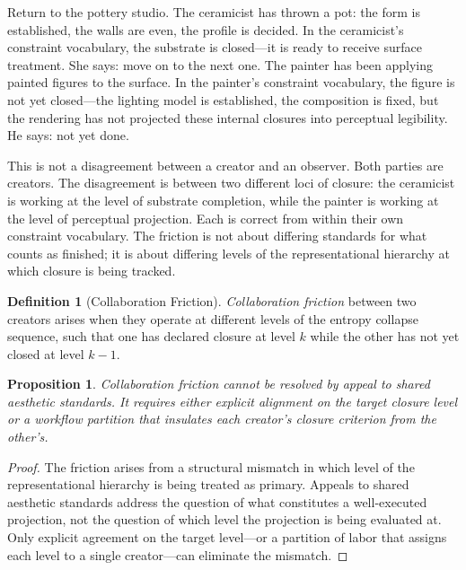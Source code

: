 \documentclass[11pt, twoside]{article}
\theoremstyle{plain}
\newtheorem{proposition}[theorem]{Proposition}
\theoremstyle{definition}
\newtheorem{definition}[theorem]{Definition}
\theoremstyle{remark}
\begin{document}
Return to the pottery studio. The ceramicist has thrown a pot: the form is established, the walls are even, the profile is decided. In the ceramicist's constraint vocabulary, the substrate is closed---it is ready to receive surface treatment. She says: move on to the next one. The painter has been applying painted figures to the surface. In the painter's constraint vocabulary, the figure is not yet closed---the lighting model is established, the composition is fixed, but the rendering has not projected these internal closures into perceptual legibility. He says: not yet done.

This is not a disagreement between a creator and an observer. Both parties are creators. The disagreement is between two different loci of closure: the ceramicist is working at the level of substrate completion, while the painter is working at the level of perceptual projection. Each is correct from within their own constraint vocabulary. The friction is not about differing standards for what counts as finished; it is about differing levels of the representational hierarchy at which closure is being tracked.

\begin{definition}[Collaboration Friction]
\emph{Collaboration friction} between two creators arises when they operate at different levels of the entropy collapse sequence, such that one has declared closure at level $k$ while the other has not yet closed at level $k-1$.
\end{definition}

\begin{proposition}
\label{prop:friction}
Collaboration friction cannot be resolved by appeal to shared aesthetic standards. It requires either explicit alignment on the target closure level or a workflow partition that insulates each creator's closure criterion from the other's.
\end{proposition}

\begin{proof}
The friction arises from a structural mismatch in which level of the representational hierarchy is being treated as primary. Appeals to shared aesthetic standards address the question of what constitutes a well-executed projection, not the question of which level the projection is being evaluated at. Only explicit agreement on the target level---or a partition of labor that assigns each level to a single creator---can eliminate the mismatch.
\end{proof}
\end{document}
